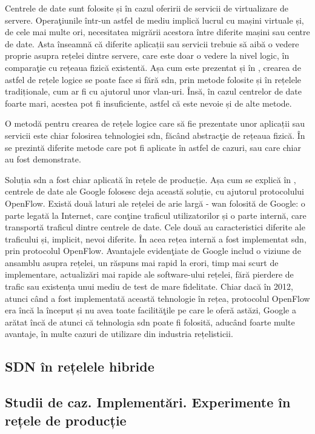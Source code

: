 Centrele de date sunt folosite și în cazul oferirii de servicii de virtualizare de servere. Operaţiunile într-un astfel de mediu implică lucrul cu mașini virtuale și, de cele mai multe ori, necesitatea migrării acestora între diferite mașini sau centre de date. Asta înseamnă că diferite aplicații sau servicii trebuie să aibă o vedere proprie asupra rețelei dintre servere, care este doar o vedere la nivel logic, în comparaţie cu rețeaua fizică existentă. Așa cum este prezentat și în \cite{nadeau2013sdn}, crearea de astfel de rețele logice se poate face si fără \gls{sdn}, prin metode folosite și în rețelele tradiționale, cum ar fi cu ajutorul unor \gls{vlan}-uri. Însă, în cazul centrelor de date foarte mari, acestea pot fi insuficiente, astfel că este nevoie și de alte metode.

O metodă pentru crearea de rețele logice care să fie prezentate unor aplicații sau servicii este chiar folosirea tehnologiei \gls{sdn}, făcând abstracţie de rețeaua fizică. În \cite{onf_openflow_backbone2012, onf_sdn_datacenter2013, liu2014sdn, munoz2015integrated} se prezintă diferite metode care pot fi aplicate în astfel de cazuri, sau care chiar au fost demonstrate.

Soluția \gls{sdn} a fost chiar aplicată în rețele de producție. Așa cum se explică în \cite{google_casestudy}, centrele de date ale Google folosesc deja această soluție, cu ajutorul protocolului OpenFlow. Există două laturi ale rețelei de arie largă - \gls{wan} folosită de Google: o parte legată la Internet, care conţine traficul utilizatorilor și o parte internă, care transportă traficul dintre centrele de date. Cele două au caracteristici diferite ale traficului și, implicit, nevoi diferite. În acea rețea internă a fost implementat \gls{sdn}, prin protocolul OpenFlow. Avantajele evidenţiate de Google includ o viziune de ansamblu asupra rețelei, un răspuns mai rapid la erori, timp mai scurt de implementare, actualizări mai rapide ale software-ului rețelei, fără pierdere de trafic sau existența unui mediu de test de mare fidelitate. Chiar dacă în 2012, atunci când a fost implementată această tehnologie în rețea, protocolul OpenFlow era încă la început și nu avea toate facilităţile pe care le oferă astăzi, Google a arătat încă de atunci că tehnologia \gls{sdn} poate fi folosită, aducând foarte multe avantaje, în multe cazuri de utilizare din industria rețelisticii.


\subsection{SDN în rețelele hibride}

\subsection{Studii de caz. Implementări. Experimente în rețele de producție}
